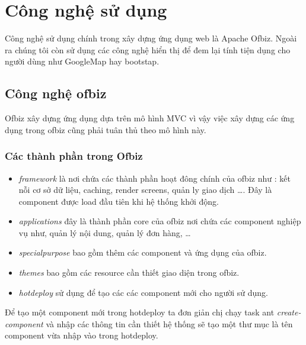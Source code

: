 \documentclass[a4paper,12pt]{report}
\begin{document}
\section{Công nghệ sử dụng}
Công nghệ sử dụng chính trong xây dựng ứng dụng web là Apache Ofbiz. Ngoài ra chúng tôi còn sử dụng các công nghệ hiển thị để đem lại tính tiện dụng cho người dùng như GoogleMap hay bootstap.
\subsection{Công nghệ ofbiz}
Ofbiz xây dựng ứng dụng dựa trên mô hình MVC vì vậy việc xây dựng các ứng dụng trong ofbiz cũng phải tuân thủ theo mô hình này. 	
\subsubsection{Các thành phần trong Ofbiz}
\begin{itemize}
\item \textit{framework} là nơi chứa các thành phần hoạt đông chính của ofbiz như : kết nỗi cơ sở dữ liệu, caching, render screens, quản ly giao dịch \ldots. Đây là component được load đầu tiên khi hệ thống khởi động.
\item \textit{applications} đây là thành phần core của ofbiz nơi chứa các component nghiệp vụ như, quản lý nội dung, quản lý đơn hàng, \ldots

\item \textit{specialpurpose} bao gồm thêm các component và ứng dụng của ofbiz.
\item \textit{themes} bao gồm các resource cần thiết giao diện trong ofbiz.
\item \textit{hotdeploy} sử dụng để tạo các các component mới cho người sử dụng.
\end{itemize}
Để tạo một component mới trong hotdeploy ta đơn giản chị chạy task ant \textit{create-component} và nhập các thông tin cần thiết hệ thống sẽ tạo một thư mục là tên component vừa nhập vào trong hotdeploy. \\
\end{document}
